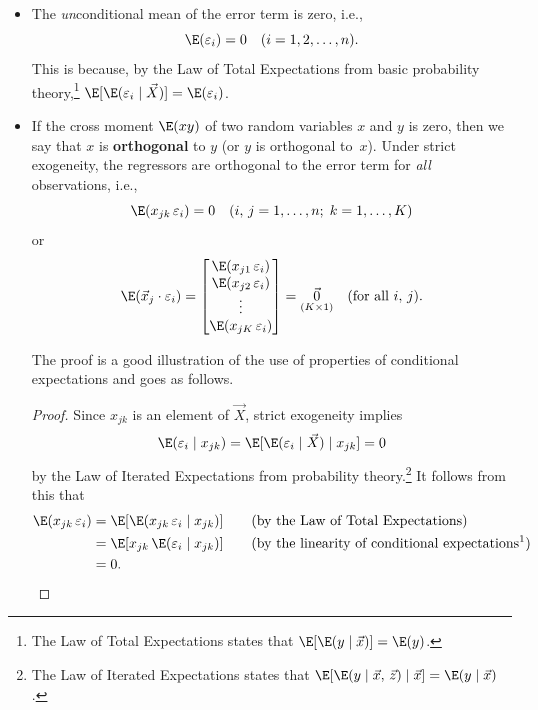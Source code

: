 \begin{itemize}
\item The \emph{un}conditional mean of the error term is zero, i.e.,
\begin{equation}
  \E(\varepsilon_i) = 0 \quad (i = 1, 2, \ldots, n).
  \label{eq:1.1.8}
\end{equation}
This is because, by the Law of Total Expectations from basic probability
theory,\footnote{The Law of Total Expectations states that
$\E[\E(y \mid \vec{x})] = \E(y)$.}
$\E[\E(\varepsilon_i \mid \vec{X})] = \E(\varepsilon_i)$.

\item If the cross moment $\E(xy)$ of two random variables $x$ and $y$ is zero,
then we say that $x$ is \textbf{orthogonal} to $y$ (or $y$ is orthogonal
to~$x$).  Under strict exogeneity, the regressors are orthogonal to the error
term for \emph{all} observations, i.e.,
\[
  \E(x_{jk}\,\varepsilon_i) = 0 \quad (i,\, j = 1, \ldots, n;\; k = 1, \ldots, K)
\]
or
\begin{equation}
  \E(\vec{x}_j \cdot \varepsilon_i)
  = \begin{bmatrix}
      \E(x_{j1}\,\varepsilon_i) \\
      \E(x_{j2}\,\varepsilon_i) \\
      \vdots \\
      \E(x_{jK}\,\varepsilon_i)
    \end{bmatrix}
  = \underset{(K \times 1)}{\vec{0}}
  \quad \text{(for all } i,\, j\text{)}.
  \label{eq:1.1.9}
\end{equation}

The proof is a good illustration of the use of properties of conditional
expectations and goes as follows.

\begin{proof}
Since $x_{jk}$ is an element of $\vec{X}$, strict exogeneity implies
\begin{equation}
  \E(\varepsilon_i \mid x_{jk})
  = \E[\E(\varepsilon_i \mid \vec{X}) \mid x_{jk}] = 0
  \label{eq:1.1.10}
\end{equation}
by the Law of Iterated Expectations from probability
theory.\footnote{The Law of Iterated Expectations states that
$\E[\E(y \mid \vec{x},\, \vec{z}) \mid \vec{x}] = \E(y \mid \vec{x})$.}
It follows from this that
\begin{align*}
  \E(x_{jk}\,\varepsilon_i)
    &= \E[\E(x_{jk}\,\varepsilon_i \mid x_{jk})]
       &\quad&\text{(by the Law of Total Expectations)} \\
    &= \E[x_{jk}\,\E(\varepsilon_i \mid x_{jk})]
       &&\text{(by the linearity of conditional expectations\footnotemark)} \\
    &= 0.
\end{align*}
\end{proof}


\end{itemize}
